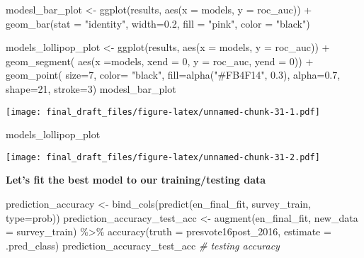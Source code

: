 \documentclass[
]{article}
\newenvironment{Shaded}{\begin{snugshade}}{\end{snugshade}}
\newcommand{\AttributeTok}[1]{\textcolor[rgb]{0.77,0.63,0.00}{#1}}
\newcommand{\CommentTok}[1]{\textcolor[rgb]{0.56,0.35,0.01}{\textit{#1}}}
\newcommand{\DecValTok}[1]{\textcolor[rgb]{0.00,0.00,0.81}{#1}}
\newcommand{\FloatTok}[1]{\textcolor[rgb]{0.00,0.00,0.81}{#1}}
\newcommand{\FunctionTok}[1]{\textcolor[rgb]{0.00,0.00,0.00}{#1}}
\newcommand{\NormalTok}[1]{#1}
\newcommand{\OtherTok}[1]{\textcolor[rgb]{0.56,0.35,0.01}{#1}}
\newcommand{\SpecialCharTok}[1]{\textcolor[rgb]{0.00,0.00,0.00}{#1}}
\newcommand{\StringTok}[1]{\textcolor[rgb]{0.31,0.60,0.02}{#1}}
\begin{document}
\begin{Shaded}
\begin{Highlighting}[]
\NormalTok{modesl\_bar\_plot }\OtherTok{\textless{}{-}} \FunctionTok{ggplot}\NormalTok{(results, }
       \FunctionTok{aes}\NormalTok{(}\AttributeTok{x =}\NormalTok{ models, }\AttributeTok{y =}\NormalTok{ roc\_auc)) }\SpecialCharTok{+} 
  \FunctionTok{geom\_bar}\NormalTok{(}\AttributeTok{stat =} \StringTok{"identity"}\NormalTok{, }\AttributeTok{width=}\FloatTok{0.2}\NormalTok{, }\AttributeTok{fill =} \StringTok{"pink"}\NormalTok{, }\AttributeTok{color =} \StringTok{"black"}\NormalTok{) }

\NormalTok{models\_lollipop\_plot }\OtherTok{\textless{}{-}} \FunctionTok{ggplot}\NormalTok{(results, }\FunctionTok{aes}\NormalTok{(}\AttributeTok{x =}\NormalTok{ models, }\AttributeTok{y =}\NormalTok{ roc\_auc)) }\SpecialCharTok{+} 
    \FunctionTok{geom\_segment}\NormalTok{( }\FunctionTok{aes}\NormalTok{(}\AttributeTok{x =}\NormalTok{models, }\AttributeTok{xend =} \DecValTok{0}\NormalTok{, }\AttributeTok{y =}\NormalTok{ roc\_auc, }\AttributeTok{yend =} \DecValTok{0}\NormalTok{)) }\SpecialCharTok{+}
  \FunctionTok{geom\_point}\NormalTok{( }\AttributeTok{size=}\DecValTok{7}\NormalTok{, }\AttributeTok{color=} \StringTok{"black"}\NormalTok{, }\AttributeTok{fill=}\FunctionTok{alpha}\NormalTok{(}\StringTok{"\#FB4F14"}\NormalTok{, }\FloatTok{0.3}\NormalTok{), }\AttributeTok{alpha=}\FloatTok{0.7}\NormalTok{, }\AttributeTok{shape=}\DecValTok{21}\NormalTok{, }\AttributeTok{stroke=}\DecValTok{3}\NormalTok{)}
\NormalTok{modesl\_bar\_plot}
\end{Highlighting}
\end{Shaded}

\texttt{[image: final\_draft\_files/figure-latex/unnamed-chunk-31-1.pdf]}

\begin{Shaded}
\begin{Highlighting}[]
\NormalTok{models\_lollipop\_plot}
\end{Highlighting}
\end{Shaded}

\texttt{[image: final\_draft\_files/figure-latex/unnamed-chunk-31-2.pdf]}

\textbf{Let's fit the best model to our training/testing data}

\begin{Shaded}
\begin{Highlighting}[]
\NormalTok{prediction\_accuracy }\OtherTok{\textless{}{-}} \FunctionTok{bind\_cols}\NormalTok{(}\FunctionTok{predict}\NormalTok{(en\_final\_fit, survey\_train, }\AttributeTok{type=}\StringTok{\textquotesingle{}prob\textquotesingle{}}\NormalTok{))}
\NormalTok{prediction\_accuracy\_test\_acc }\OtherTok{\textless{}{-}} \FunctionTok{augment}\NormalTok{(en\_final\_fit, }\AttributeTok{new\_data =}\NormalTok{ survey\_train) }\SpecialCharTok{\%\textgreater{}\%}
  \FunctionTok{accuracy}\NormalTok{(}\AttributeTok{truth =} \StringTok{\textquotesingle{}presvote16post\_2016\textquotesingle{}}\NormalTok{, }\AttributeTok{estimate =}\NormalTok{ .pred\_class)}
\NormalTok{prediction\_accuracy\_test\_acc }\CommentTok{\# testing accuracy}
\end{Highlighting}
\end{Shaded}
\end{document}
